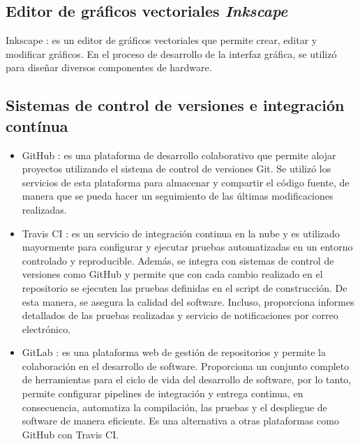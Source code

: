 \subsection{Editor de gráficos vectoriales \textit{Inkscape}}
\label{sec:Inkscape}

Inkscape \citep{inkscape}: es un editor de gráficos vectoriales que permite crear, editar y modificar gráficos. En el proceso de desarrollo de la interfaz gráfica, se utilizó para diseñar diversos componentes de hardware.

\subsection{Sistemas de control de versiones e integración contínua}
\label{sec:gitYAmigos}

\begin{itemize}
	\item GitHub \citep{GitHub}: es una plataforma de desarrollo colaborativo que permite alojar proyectos utilizando el sistema de control de versiones Git. Se utilizó los servicios de esta plataforma para almacenar y
compartir el código fuente, de manera que se pueda hacer un seguimiento
de las últimas modificaciones realizadas.
	
	\item Travis CI \citep{TravisCI}: es un servicio de integración continua en la nube y es utilizado mayormente para configurar y ejecutar pruebas automatizadas en un entorno controlado y reproducible. Además, se integra con sistemas de control de versiones como GitHub y permite que con cada cambio realizado en el repositorio se ejecuten las pruebas definidas en el script de construcción.
De esta manera, se asegura la calidad del software. Incluso, proporciona informes detallados de las pruebas realizadas y servicio de notificaciones por correo electrónico.

	\item GitLab \citep{GitLab}: es una plataforma web de gestión de repositorios y permite la colaboración en el desarrollo de software. Proporciona un conjunto completo de herramientas para el ciclo de vida del desarrollo de software, por lo tanto, permite configurar pipelines de integración y entrega continua, en consecuencia, automatiza la compilación, las pruebas y el despliegue de software de manera eficiente. Es una alternativa a otras plataformas como GitHub con Travis CI.
\end{itemize}

